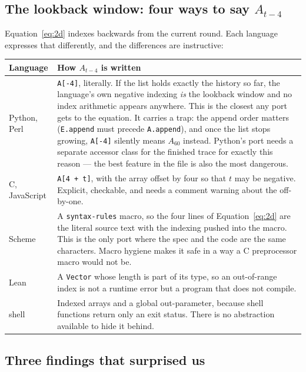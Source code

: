 \documentclass[11pt,a4paper]{article}
\newcommand{\code}[1]{\texttt{#1}}
\begin{document}
\subsection{The lookback window: four ways to say $A_{t-4}$}

Equation~\eqref{eq:2d} indexes backwards from the current round. Each language
expresses that differently, and the differences are instructive:

\begin{longtable}{@{}p{2.3cm}p{12.3cm}@{}}
\toprule
\textbf{Language} & \textbf{How $A_{t-4}$ is written} \\
\midrule
\endhead
Python, Perl &
  \code{A[-4]}, literally. If the list holds exactly the history so far, the
  language's own negative indexing \emph{is} the lookback window and no index
  arithmetic appears anywhere. This is the closest any port gets to the
  equation. It carries a trap: the append order matters
  (\code{E.append} must precede \code{A.append}), and once the list stops
  growing, \code{A[-4]} silently means $A_{60}$ instead. Python's port needs a
  separate accessor class for the finished trace for exactly this reason ---
  the best feature in the file is also the most dangerous. \\
\addlinespace
C, JavaScript &
  \code{A[4 + t]}, with the array offset by four so that $t$ may be negative.
  Explicit, checkable, and needs a comment warning about the off-by-one. \\
\addlinespace
Scheme &
  A \code{syntax-rules} macro, so the four lines of Equation~\eqref{eq:2d} are
  the literal source text with the indexing pushed into the macro. This is the
  only port where the spec and the code are the same characters. Macro hygiene
  makes it safe in a way a C preprocessor macro would not be. \\
\addlinespace
Lean &
  A \code{Vector} whose length is part of its type, so an out-of-range index
  is not a runtime error but a program that does not compile. \\
\addlinespace
shell &
  Indexed arrays and a global out-parameter, because shell functions return
  only an exit status. There is no abstraction available to hide it behind. \\
\bottomrule
\end{longtable}

\subsection{Three findings that surprised us}
\end{document}

